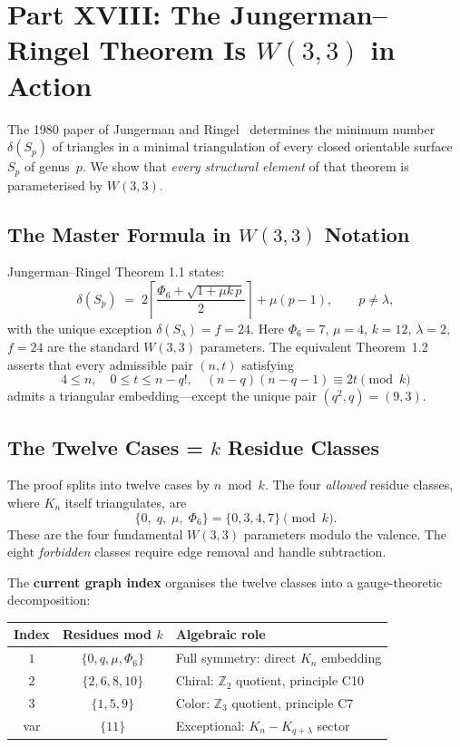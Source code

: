\section{\texorpdfstring{Part XVIII: The Jungerman--Ringel Theorem Is $W(3,3)$ in Action}{Part XVIII: The Jungerman--Ringel Theorem Is W(3,3) in Action}}

The 1980 paper of Jungerman and Ringel~\cite{JR1980} determines the minimum number $\delta(S_p)$ of triangles in a minimal triangulation of every closed orientable surface~$S_p$ of genus~$p$.  We show that \emph{every structural element} of that theorem is parameterised by $W(3,3)$.

\subsection{The Master Formula in $W(3,3)$ Notation}

Jungerman--Ringel Theorem 1.1 states:
\[
  \delta(S_p) \;=\; 2\!\left\lceil\frac{\Phi_6 + \sqrt{1 + \mu k\,p}}{2}\right\rceil + \mu(p - 1),
  \qquad p \neq \lambda,
\]
with the unique exception $\delta(S_\lambda) = f = 24$.  Here $\Phi_6 = 7$, $\mu = 4$, $k = 12$, $\lambda = 2$, $f = 24$ are the standard $W(3,3)$ parameters.  The equivalent Theorem~1.2 asserts that every admissible pair $(n,t)$ satisfying
\[
  4 \le n,\quad 0 \le t \le n - q!,\quad (n-q)(n-q-1) \equiv 2t \pmod{k}
\]
admits a triangular embedding---except the unique pair $(q^2, q) = (9,3)$.

\subsection{The Twelve Cases = $k$ Residue Classes}

The proof splits into twelve cases by $n \bmod k$.  The four \emph{allowed} residue classes, where $K_n$ itself triangulates, are
\[
  \{0,\; q,\; \mu,\; \Phi_6\} = \{0, 3, 4, 7\} \pmod{k}.
\]
These are the four fundamental $W(3,3)$ parameters modulo the valence.  The eight \emph{forbidden} classes require edge removal and handle subtraction.

\medskip\noindent
The \textbf{current graph index} organises the twelve classes into a gauge-theoretic decomposition:

\begin{center}
\begin{tabular}{ccl}
\hline
Index & Residues mod $k$ & Algebraic role \\ \hline
$1$ & $\{0, q, \mu, \Phi_6\}$ & Full symmetry: direct $K_n$ embedding \\
$2$ & $\{2, 6, 8, 10\}$ & Chiral: $\mathbb{Z}_2$ quotient, principle C10 \\
$3$ & $\{1, 5, 9\}$ & Color: $\mathbb{Z}_3$ quotient, principle C7 \\
var & $\{11\}$ & Exceptional: $K_n - K_{q+\lambda}$ sector \\
\hline
\end{tabular}
\end{center}

